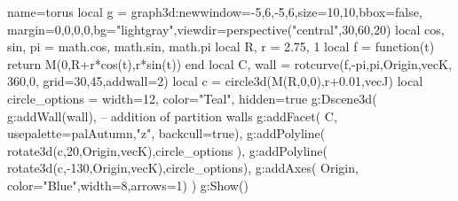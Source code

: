 \documentclass[border=5pt]{standalone}%
\begin{document}
\begin{luadraw}{name=torus}
local g = graph3d:new{window={-5,6,-5,6},size={10,10},bbox=false, margin={0,0,0,0},bg="lightgray",viewdir=perspective("central",30,60,20)}
local cos, sin, pi = math.cos, math.sin, math.pi
local R, r = 2.75, 1
local f = function(t) return M(0,R+r*cos(t),r*sin(t)) end
local C, wall = rotcurve(f,-pi,pi,{Origin,vecK}, 360,0, {grid={30,45},addwall=2})
local c = circle3d(M(R,0,0),r+0.01,vecJ)
local circle_options = {width=12, color="Teal", hidden=true}
g:Dscene3d(
    g:addWall(wall), -- addition of partition walls
    g:addFacet( C, {usepalette={palAutumn,"z"}, backcull=true}),
    g:addPolyline( rotate3d(c,20,{Origin,vecK}),circle_options ),
    g:addPolyline( rotate3d(c,-130,{Origin,vecK}),circle_options),
    g:addAxes( Origin, {color="Blue",width=8,arrows=1})
)
g:Show()
\end{luadraw}
\end{document}
